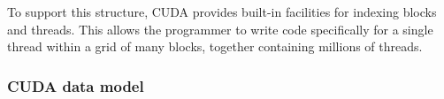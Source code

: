 To support this structure, CUDA provides built-in facilities for indexing blocks and threads. This allows the programmer to write code specifically for a single thread within a grid of many blocks, together containing millions of threads.


\subsubsection{CUDA data model}

